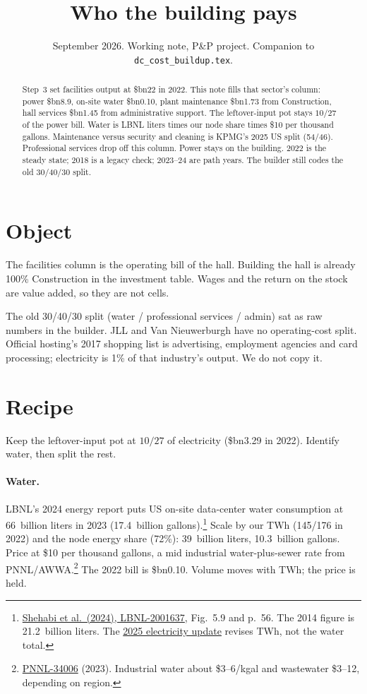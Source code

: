 \documentclass[11pt]{article}
\title{Who the building pays}
\author{}
\date{September 2026. Working note, P\&P project. Companion to \texttt{dc\_cost\_buildup.tex}.}
\newcommand{\bn}{\$bn}
\begin{document}
\maketitle

\begin{abstract}
\noindent Step~3 set facilities output at \bn22 in 2022. This note fills that sector's column: power \bn8.9, on-site water \bn0.10, plant maintenance \bn1.73 from Construction, hall services \bn1.45 from administrative support. The leftover-input pot stays $10/27$ of the power bill. Water is LBNL liters times our node share times \$10 per thousand gallons. Maintenance versus security and cleaning is KPMG's 2025 US split (54/46). Professional services drop off this column. Power stays on the building. 2022 is the steady state; 2018 is a legacy check; 2023--24 are path years. The builder still codes the old 30/40/30 split.
\end{abstract}

\section{Object}

The facilities column is the operating bill of the hall. Building the hall is already 100\% Construction in the investment table. Wages and the return on the stock are value added, so they are not cells.

The old 30/40/30 split (water / professional services / admin) sat as raw numbers in the builder. JLL and Van Nieuwerburgh have no operating-cost split. Official hosting's 2017 shopping list is advertising, employment agencies and card processing; electricity is 1\% of that industry's output. We do not copy it.

\section{Recipe}

Keep the leftover-input pot at $10/27$ of electricity (\bn3.29 in 2022). Identify water, then split the rest.

\paragraph{Water.}
LBNL's 2024 energy report puts US on-site data-center water consumption at 66~billion liters in 2023 (17.4~billion gallons).\footnote{\href{https://eta-publications.lbl.gov/sites/default/files/2024-12/lbnl-2024-united-states-data-center-energy-usage-report_1.pdf}{Shehabi et al.\ (2024), LBNL-2001637}, Fig.~5.9 and p.~56. The 2014 figure is 21.2~billion liters. The \href{https://www.energy.gov/documents/united-states-data-center-energy-usage-report-2025-update}{2025 electricity update} revises TWh, not the water total.} Scale by our TWh (145/176 in 2022) and the node energy share (72\%): 39~billion liters, 10.3~billion gallons. Price at \$10 per thousand gallons, a mid industrial water-plus-sewer rate from PNNL/AWWA.\footnote{\href{https://www.pnnl.gov/main/publications/external/technical_reports/PNNL-34006.pdf}{PNNL-34006} (2023). Industrial water about \$3--6/kgal and wastewater \$3--12, depending on region.} The 2022 bill is \bn0.10. Volume moves with TWh; the price is held.
\end{document}
